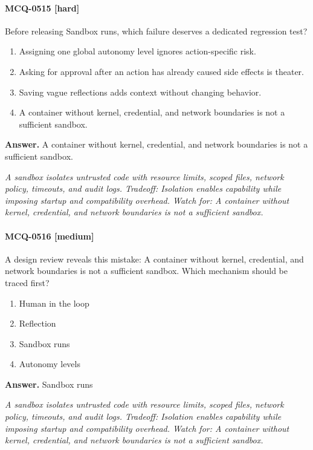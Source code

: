 \paragraph{MCQ-0515 [hard]} Before releasing Sandbox runs, which failure deserves a dedicated regression test?
\begin{enumerate}[label=\Alph*.]
\item Assigning one global autonomy level ignores action-specific risk.
\item Asking for approval after an action has already caused side effects is theater.
\item Saving vague reflections adds context without changing behavior.
\item A container without kernel, credential, and network boundaries is not a sufficient sandbox.
\end{enumerate}
\noindent\textbf{Answer.} A container without kernel, credential, and network boundaries is not a sufficient sandbox.
\par\textit{A sandbox isolates untrusted code with resource limits, scoped files, network policy, timeouts, and audit logs. Tradeoff: Isolation enables capability while imposing startup and compatibility overhead. Watch for: A container without kernel, credential, and network boundaries is not a sufficient sandbox.}
\paragraph{MCQ-0516 [medium]} A design review reveals this mistake: A container without kernel, credential, and network boundaries is not a sufficient sandbox. Which mechanism should be traced first?
\begin{enumerate}[label=\Alph*.]
\item Human in the loop
\item Reflection
\item Sandbox runs
\item Autonomy levels
\end{enumerate}
\noindent\textbf{Answer.} Sandbox runs
\par\textit{A sandbox isolates untrusted code with resource limits, scoped files, network policy, timeouts, and audit logs. Tradeoff: Isolation enables capability while imposing startup and compatibility overhead. Watch for: A container without kernel, credential, and network boundaries is not a sufficient sandbox.}

